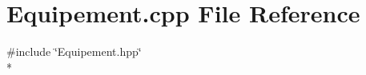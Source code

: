 \section{Equipement.\-cpp File Reference}
\label{_equipement_8cpp}
{\ttfamily \#include \char`\"{}Equipement.\-hpp\char`\"{}}\\*

